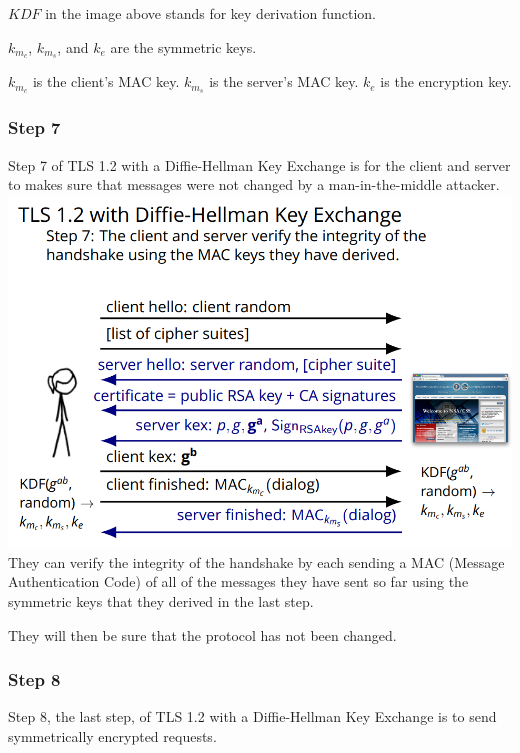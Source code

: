 \documentclass[11pt]{article} %
\begin{document}
$KDF$ in the image above stands for key derivation function.

$k_{m_c}$, $k_{m_s}$, and $k_{e}$ are the symmetric keys.

$k_{m_c}$ is the client's MAC key. $k_{m_s}$ is the server's MAC key. $k_{e}$ 
is the encryption key.

\newpage
\subsubsection{Step 7}
Step 7 of TLS 1.2 with a Diffie-Hellman Key Exchange is for the client and 
server to makes sure that messages were not changed by a man-in-the-middle 
attacker. \\

\includegraphics[scale=1.2]{./DiffieStep7.png}
\\

They can verify the integrity of the handshake by each sending a MAC (Message 
Authentication Code) of all of the messages they have sent so far using the 
symmetric keys that they derived in the last step.

They will then be sure that the protocol has not been changed.

\newpage
\subsubsection{Step 8}
Step 8, the last step, of TLS 1.2 with a Diffie-Hellman Key Exchange is to 
send symmetrically encrypted requests. \\
\end{document}
